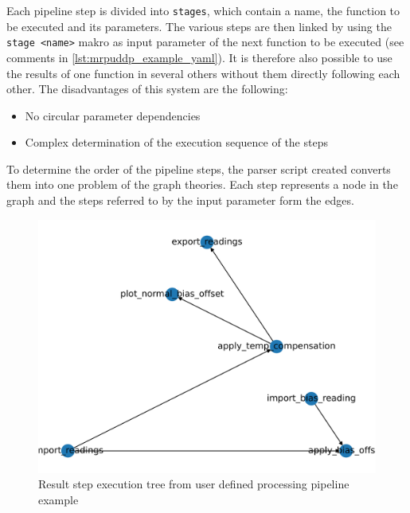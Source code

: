 Each pipeline step is divided into \passthrough{\lstinline!stages!},
which contain a name, the function to be executed and its parameters.
The various steps are then linked by using the
\passthrough{\lstinline!stage <name>!} makro as input parameter of the
next function to be executed (see comments in
\ref{lst:mrpuddp_example_yaml}). It is therefore also possible to use
the results of one function in several others without them directly
following each other. The disadvantages of this system are the
following:

\begin{itemize}
\tightlist
\item
  No circular parameter dependencies
\item
  Complex determination of the execution sequence of the steps
\end{itemize}

To determine the order of the pipeline steps, the parser script created
converts them into one problem of the graph theories. Each step
represents a node in the graph and the steps referred to by the input
parameter form the edges.

\begin{figure}
\centering
\includegraphics{./generated_images/border_Result_step_execution_tree_from_user_defined_processing_pipeline_example.png}
\caption{Result step execution tree from user defined processing
pipeline example
\label{Result_step_execution_tree_from_user_defined_processing_pipeline_example.png}}
\end{figure}

